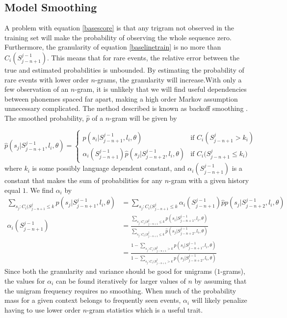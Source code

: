 \subsection{Model Smoothing}
\label{sect:basesmooth}

A problem with equation \ref{basescore} is that any trigram not observed in the training set will make the probability of observing the whole sequence zero.  Furthermore, the granularity of equation \ref{baselinetrain} is no more than $C_i(S_{j-n+1}^{j-1})$. This means that for rare events, the relative error between the true and estimated probabilities is unbounded. By estimating the probability of rare events with lower order $n$-grams, the granularity will increase.With only a few observation of an $n$-gram, it is unlikely that we will find useful dependencies between phonemes spaced far apart, making a high order Markov assumption unnecessary complicated. The method described is known as backoff smoothing \cite[p. 559]{talegk}. The smoothed probability, $\hat{p}$ of a $n$-gram will be given by

\begin{equation}
\label{basesmooth}
\hat{p}(s_j|S_{j-n+1}^{j-1}, l_i, \theta) = 
\begin{cases}
p(s_i|S_{j-n+1}^{j-1}, l_i, \theta) & \text{if $C_i(S_{j-n+1}^j > k_i)$} \\
\alpha_i(S_{j-n+1}^{j-1})\hat{p}(s_j|S_{j-n+2}^{j-1}, l_i, \theta) & \text{if $C_i(S_{j-n+1}^j \leq k_i$)}
\end{cases}
\end{equation}
where $k_i$ is some possibly language dependent constant, and $\alpha_i(S_{j-n+1}^{j-1})$ is a constant that makes the sum of probabilities for any $n$-gram with a given history equal $1$. We find $\alpha_i$ by 
\begin{align}
\sum_{s_j:C_i(S_{j-n+1}^j \leq k} p(s_j | S_{j-n+1}^{j-1}, l_i, \theta)
&= \sum_{s_j:C_i(S_{j-n+1}^j \leq k} \alpha_i(S_{j-n+1}^{j-1})\hat{p}p(s_j | S_{j-n+2}^{j-1}, l_i, \theta) \nonumber \\
\alpha_i(S_{j-n+1}^{j-1})
&= \frac{\sum_{s_j:C_i(S_{j-n+1}^j \leq k}p(s_i|S_{j-n+1}^{j-1}, l_i, \theta)}{\sum_{s_j:C_i(S_{j-n+1}^j \leq k}\hat{p}(s_j | S_{j-n+2}^{j-1}, l_i, \theta)} \nonumber \\
&=\frac{1-\sum_{s_j:C_i(S_{j-n+1}^j > k}p(s_i|S_{j-n+1}^{j-1}, l_i, \theta)}{1-\sum_{s_j:C_i(S_{j-n+1}^j > k}p(s_j | S_{j-n+2}^{j-1}, l_i, \theta)}
\end{align}
Since both the granularity and variance should be good for unigrams ($1$-grams), the values for $\alpha_i$ can be found iteratively for larger values of $n$ by assuming that the unigram frequency requires no smoothing. When much of the probability mass for a given context belongs to frequently seen events, $\alpha_i$ will likely penalize having to use lower order $n$-gram statistics which is a useful trait. 

